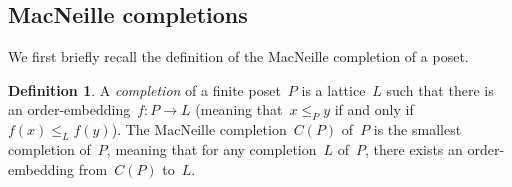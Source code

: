 \documentclass{amsart}
\newtheorem{lemma}[theorem]{Lemma}
\theoremstyle{definition}
\newtheorem{definition}[theorem]{Definition}
\newcommand{\ssm}{\smallsetminus} %
\DeclareMathOperator{\tc}{tc} %
\newcommand{\darkblue}{\color{darkblue}} %
\newcommand{\defn}[1]{\textsl{\darkblue #1}} %
\begin{document}
%
%
%
%


\subsection{MacNeille completions}
\label{subsec:MacNeilleT}

We first briefly recall the definition of the MacNeille completion of a poset.

\begin{definition}
\label{def:MacNeilleCompletion}
A \defn{completion} of a finite poset~$P$ is a lattice~$L$ such that there is an order-embedding~$f : P \to L$ (meaning that~$x \le_P y$ if and only if~$f(x) \le_L f(y)$).
The MacNeille completion~$C(P)$ of~$P$ is the smallest completion of~$P$, meaning that for any completion~$L$ of~$P$, there exists an order-embedding from~$C(P)$ to~$L$.
\end{definition}
\end{document}
